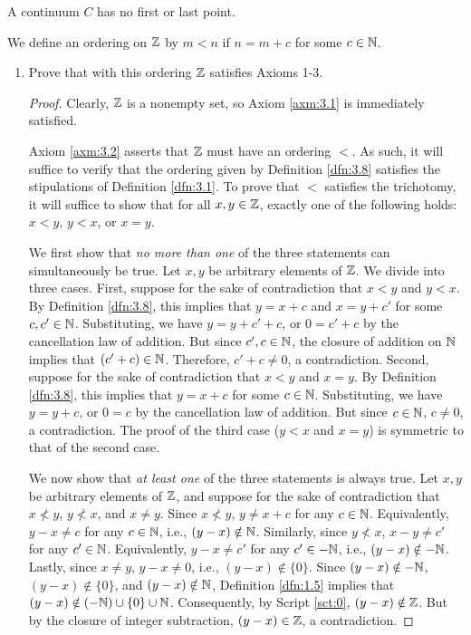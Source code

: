 \documentclass[../main.tex]{subfiles}
\begin{document}
\begin{axiom}\label{axm:3.3}
    A continuum $C$ has no first or last point.
\end{axiom}

\begin{definition}\label{dfn:3.8}
    We define an ordering on $\mathbb{Z}$ by $m<n$ if $n=m+c$ for some $c\in\mathbb{N}$.
\end{definition}

\begin{exercise}\label{exr:3.9}\leavevmode
    \begin{enumerate}[label={\alph*)},ref={\thetheorem\alph*}]
        \item \label{exr:3.9a}Prove that with this ordering $\mathbb{Z}$ satisfies Axioms 1-3.
        \begin{proof}
            Clearly, $\mathbb{Z}$ is a nonempty set, so Axiom \ref{axm:3.1} is immediately satisfied.\par\medskip
            Axiom \ref{axm:3.2} asserts that $\mathbb{Z}$ must have an ordering $<$. As such, it will suffice to verify that the ordering given by Definition \ref{dfn:3.8} satisfies the stipulations of Definition \ref{dfn:3.1}. To prove that $<$ satisfies the trichotomy, it will suffice to show that for all $x,y\in\mathbb{Z}$, exactly one of the following holds: $x<y$, $y<x$, or $x=y$.\par
            We first show that \emph{no more than one} of the three statements can simultaneously be true. Let $x,y$ be arbitrary elements of $\mathbb{Z}$. We divide into three cases. First, suppose for the sake of contradiction that $x<y$ and $y<x$. By Definition \ref{dfn:3.8}, this implies that $y=x+c$ and $x=y+c'$ for some $c,c'\in\mathbb{N}$. Substituting, we have $y=y+c'+c$, or $0=c'+c$ by the cancellation law of addition. But since $c',c\in\mathbb{N}$, the closure of addition on $\mathbb{N}$ implies that $(c'+c)\in\mathbb{N}$. Therefore, $c'+c\neq 0$, a contradiction. Second, suppose for the sake of contradiction that $x<y$ and $x=y$. By Definition \ref{dfn:3.8}, this implies that $y=x+c$ for some $c\in\mathbb{N}$. Substituting, we have $y=y+c$, or $0=c$ by the cancellation law of addition. But since $c\in\mathbb{N}$, $c\neq 0$, a contradiction. The proof of the third case ($y<x$ and $x=y$) is symmetric to that of the second case.\par
            We now show that \emph{at least one} of the three statements is always true. Let $x,y$ be arbitrary elements of $\mathbb{Z}$, and suppose for the sake of contradiction that $x\not<y$, $y\not<x$, and $x\neq y$. Since $x\not<y$, $y\neq x+c$ for any $c\in\mathbb{N}$. Equivalently, $y-x\neq c$ for any $c\in\mathbb{N}$, i.e., $(y-x)\notin\mathbb{N}$. Similarly, since $y\not<x$, $x-y\neq c'$ for any $c'\in\mathbb{N}$. Equivalently, $y-x\neq c'$ for any $c'\in -\mathbb{N}$, i.e., $(y-x)\notin -\mathbb{N}$. Lastly, since $x\neq y$, $y-x\neq 0$, i.e., $(y-x)\notin\{0\}$. Since $(y-x)\notin-\mathbb{N}$, $(y-x)\notin\{0\}$, and $(y-x)\notin\mathbb{N}$, Definition \ref{dfn:1.5} implies that $(y-x)\notin(-\mathbb{N})\cup\{0\}\cup\mathbb{N}$. Consequently, by Script \ref{sct:0}, $(y-x)\notin\mathbb{Z}$. But by the closure of integer subtraction, $(y-x)\in\mathbb{Z}$, a contradiction.\par\smallskip

\end{proof}
\end{enumerate}
\end{exercise}
\end{document}
